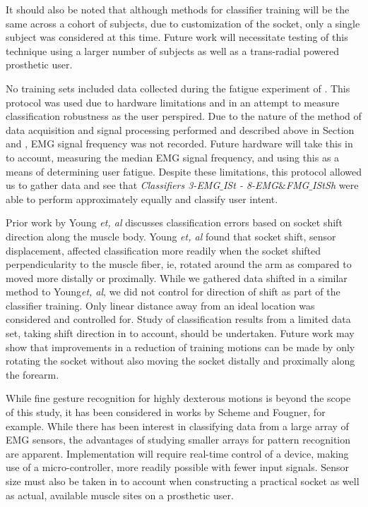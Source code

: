 \documentclass[twocolumn]{sagej}
\begin{document}
It should also be noted that although methods for classifier training will be the same across a cohort of subjects, due to customization of the socket, only a single subject was considered at this time.  Future work will necessitate testing of this technique using a larger number of subjects as well as a trans-radial powered prosthetic user.\par \noindent
No training sets included data collected during the fatigue experiment of \textit{}.  This protocol was used due to hardware limitations and in an attempt to measure classification robustness as the user perspired.  Due to the nature of the method of data acquisition and signal processing performed and described above in Section \textit{} and \textit{}, EMG signal frequency was not recorded. Future hardware will take this in to account, measuring the median EMG signal frequency, and using this as a means of determining user fatigue.  Despite these limitations, this protocol allowed us to gather data and see that \textit{Classifiers 3-EMG$\_$ISt - 8-EMG$\&$FMG$\_$IStSh} were able to perform approximately equally and classify user intent. \par \noindent
Prior work by Young \textit{et, al} discusses classification errors based on socket shift direction along the muscle body\cite{Young2011}.  Young \textit{et, al}  found that socket shift, sensor displacement, affected classification more readily when the socket shifted perpendicularity to the muscle fiber, ie, rotated around the arm as compared to moved more distally or proximally.  While we gathered data shifted in a similar method to Young\textit{et, al}, we did not control for direction of shift as part of the classifier training. Only linear distance away from an ideal location was considered and controlled for. Study of classification results from a limited data set, taking shift direction in to account, should be undertaken. Future work may show that improvements in a reduction of training motions can be made by only rotating the socket without also moving the socket distally and proximally along the forearm. \par \noindent 
While fine gesture recognition for highly dexterous motions is beyond the scope of this study, it has been considered in works by Scheme and Fougner, for example.  While there has been interest in classifying data from a large array of EMG sensors, the advantages of studying smaller arrays for pattern recognition are apparent.  Implementation will require real-time control of a device, making use of a micro-controller, more readily possible with fewer input signals.  Sensor size must also be taken in to account when constructing a practical socket as well as actual, available muscle sites on a prosthetic user. \par \noindent
\end{document}
